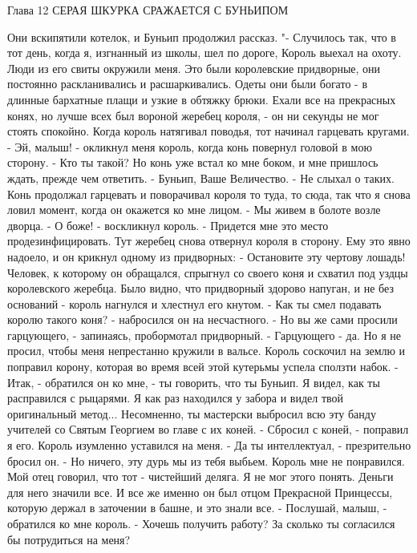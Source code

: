 Глава 12
        СЕРАЯ ШКУРКА СРАЖАЕТСЯ С БУНЬИПОМ

    Они вскипятили котелок, и Буньип продолжил рассказ.
    "- Случилось так, что в тот день, когда я, изгнанный из школы, шел 
по дороге, Король выехал на охоту. Люди из его свиты окружили меня. 
Это были королевские придворные, они постоянно раскланивались и 
расшаркивались. Одеты они были богато - в длинные бархатные плащи и 
узкие в обтяжку брюки. Ехали все на прекрасных конях, но лучше всех 
был вороной жеребец короля, - он ни секунды не мог стоять спокойно. 
Когда король натягивал поводья, тот начинал гарцевать кругами.
    - Эй, малыш! - окликнул меня король, когда конь повернул головой в 
мою сторону. - Кто ты такой?
    Но конь уже встал ко мне боком, и мне пришлось ждать, прежде чем 
ответить.
    - Буньип, Ваше Величество.
    - Не слыхал о таких.
    Конь продолжал гарцевать и поворачивал короля то туда, то сюда, 
так что я снова ловил момент, когда он окажется ко мне лицом.
    - Мы живем в болоте возле дворца.
    - О боже! - воскликнул король. - Придется мне это место 
продезинфицировать.
    Тут жеребец снова отвернул короля в сторону. Ему это явно надоело, 
и он крикнул одному из придворных:
    - Остановите эту чертову лошадь!
    Человек, к которому он обращался, спрыгнул со своего коня и 
схватил под уздцы королевского жеребца. Было видно, что придворный 
здорово напуган, и не без оснований - король нагнулся и хлестнул его 
кнутом.
    - Как ты смел подавать королю такого коня? - набросился он на 
несчастного.
    - Но вы же сами просили гарцующего, - запинаясь, пробормотал 
придворный.
    - Гарцующего - да. Но я не просил, чтобы меня непрестанно кружили 
в вальсе.
    Король соскочил на землю и поправил корону, которая во время всей 
этой кутерьмы успела сползти набок.
    - Итак, - обратился он ко мне, - ты говорить, что ты Буньип. Я 
видел, как ты расправился с рыцарями. Я как раз находился у забора и 
видел твой оригинальный метод... Несомненно, ты мастерски выбросил всю 
эту банду учителей со Святым Георгием во главе с их коней.
    - Сбросил с коней, - поправил я его. Король изумленно уставился на 
меня.
    - Да ты интеллектуал, - презрительно бросил он. - Но ничего, эту 
дурь мы из тебя выбьем.
    Король мне не понравился. Мой отец говорил, что тот - чистейший 
деляга. Я не мог этого понять. Деньги для него значили все. И все же 
именно он был отцом Прекрасной Принцессы, которую держал в заточении в 
башне, и это знали все.
    - Послушай, малыш, - обратился ко мне король. - Хочешь получить 
работу? За сколько ты согласился бы потрудиться на меня?
